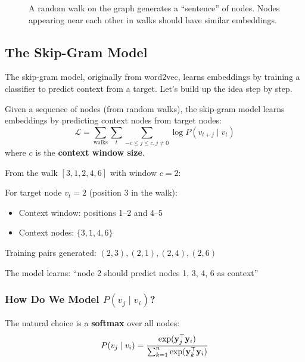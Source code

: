 \begin{notechapter}
\begin{figure}[htbp]
\caption{A random walk on the graph generates a ``sentence'' of nodes. Nodes appearing near each other in walks should have similar embeddings.}
\label{shallow-embeddings:fig:random_walk}
\end{figure}

\subsection{The Skip-Gram Model}

The skip-gram model, originally from word2vec, learns embeddings by training a classifier to predict context from a target. Let's build up the idea step by step.

\begin{definition}
Given a sequence of nodes (from random walks), the skip-gram model learns embeddings by predicting context nodes from target nodes:
\[
\mathcal{L} = \sum_{\text{walks}} \sum_{t} \sum_{-c \leq j \leq c, j \neq 0} \log P(v_{t+j} \mid v_t)
\]
where $c$ is the \textbf{context window size}.
\end{definition}

\begin{example}
From the walk $[3, 1, 2, 4, 6]$ with window $c = 2$:

For target node $v_t = 2$ (position 3 in the walk):
\begin{itemize}
    \item Context window: positions 1--2 and 4--5
    \item Context nodes: $\{3, 1, 4, 6\}$
\end{itemize}

Training pairs generated: $(2, 3), (2, 1), (2, 4), (2, 6)$

The model learns: ``node 2 should predict nodes 1, 3, 4, 6 as context''
\end{example}

\subsubsection*{How Do We Model $P(v_j \mid v_i)$?}

The natural choice is a \textbf{softmax} over all nodes:
\[
P(v_j \mid v_i) = \frac{\exp(\mathbf{y}_j^\top \mathbf{y}_i)}{\sum_{k=1}^{n} \exp(\mathbf{y}_k^\top \mathbf{y}_i)}
\]


\end{notechapter}
